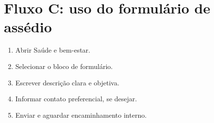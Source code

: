 \section{Fluxo C: uso do formulário de assédio}
\begin{enumerate}
  \item Abrir Saúde e bem-estar.
  \item Selecionar o bloco de formulário.
  \item Escrever descrição clara e objetiva.
  \item Informar contato preferencial, se desejar.
  \item Enviar e aguardar encaminhamento interno.
\end{enumerate}
